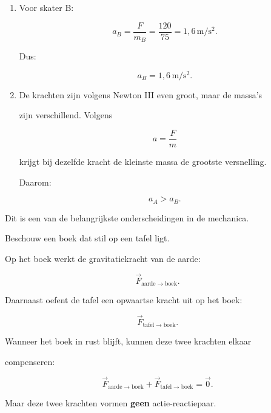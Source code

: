 \documentclass{ximera}
\begin{document}
\begin{oefening}{\oefU\ESS}
\begin{oplossing}
\begin{enumerate}
  Dus:

  \[\boxed{a_A=2{,}4\,\mathrm{m/s^2}}.\]

  \item Voor skater B:

  \[a_B=\frac{F}{m_B} =\frac{120}{75} =1{,}6\,\mathrm{m/s^2}.\]

  Dus:

  \[\boxed{a_B=1{,}6\,\mathrm{m/s^2}}.\]

  \item De krachten zijn volgens Newton III even groot, maar de massa's

  zijn verschillend. Volgens

  \[a=\frac{F}{m}\]

  krijgt bij dezelfde kracht de kleinste massa de grootste versnelling.

  Daarom:

  \[\boxed{a_A>a_B}.\]

\end{enumerate}

\end{oplossing}

\end{oefening}






Dit is een van de belangrijkste onderscheidingen in de mechanica.

Beschouw een boek dat stil op een tafel ligt.

Op het boek werkt de gravitatiekracht van de aarde:

\[\vec F_{\mathrm{aarde}\rightarrow\mathrm{boek}}.\]

Daarnaast oefent de tafel een opwaartse kracht uit op het boek:

\[\vec F_{\mathrm{tafel}\rightarrow\mathrm{boek}}.\]

Wanneer het boek in rust blijft, kunnen deze twee krachten elkaar

compenseren:

\[\vec F_{\mathrm{aarde}\rightarrow\mathrm{boek}} + \vec F_{\mathrm{tafel}\rightarrow\mathrm{boek}} = \vec 0.\]

Maar deze twee krachten vormen \textbf{geen} actie-reactiepaar.
\end{document}
